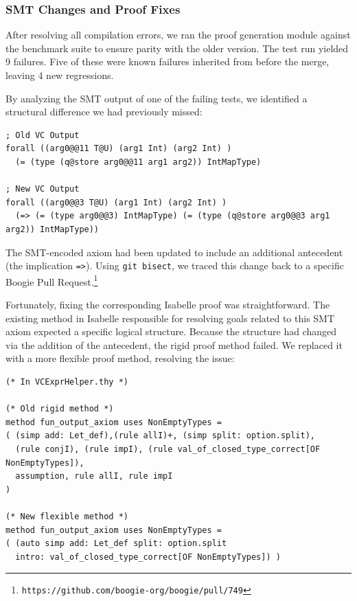 \documentclass[11pt]{article}
\begin{document}
\subsubsection{SMT Changes and Proof Fixes}
\label{sec:smt-change}

After resolving all compilation errors, we ran the proof generation module against the benchmark suite to ensure parity with the older version.
The test run yielded 9 failures. Five of these were known failures inherited from before the merge, leaving 4 new regressions.

By analyzing the SMT output of one of the failing tests, we identified a structural difference we had previously missed:

\begin{verbatim}
; Old VC Output
forall ((arg0@@11 T@U) (arg1 Int) (arg2 Int) ) 
  (= (type (q@store arg0@@11 arg1 arg2)) IntMapType)

; New VC Output
forall ((arg0@@3 T@U) (arg1 Int) (arg2 Int) ) 
  (=> (= (type arg0@@3) IntMapType) (= (type (q@store arg0@@3 arg1 arg2)) IntMapType))
\end{verbatim}

The SMT-encoded axiom had been updated to include an additional antecedent (the implication \texttt{=>}).
Using \texttt{git bisect}, we traced this change back to a specific Boogie Pull Request.\footnote{\texttt{https://github.com/boogie-org/boogie/pull/749}}

Fortunately, fixing the corresponding Isabelle proof was straightforward.
The existing method in Isabelle responsible for resolving goals related to this SMT axiom expected a specific logical structure.
Because the structure had changed via the addition of the antecedent, the rigid proof method failed.
We replaced it with a more flexible proof method, resolving the issue:

\begin{verbatim}
(* In VCExprHelper.thy *)

(* Old rigid method *)
method fun_output_axiom uses NonEmptyTypes =
( (simp add: Let_def),(rule allI)+, (simp split: option.split),
  (rule conjI), (rule impI), (rule val_of_closed_type_correct[OF NonEmptyTypes]),
  assumption, rule allI, rule impI
)

(* New flexible method *)
method fun_output_axiom uses NonEmptyTypes =
( (auto simp add: Let_def split: option.split
  intro: val_of_closed_type_correct[OF NonEmptyTypes]) )
\end{verbatim}
\end{document}
